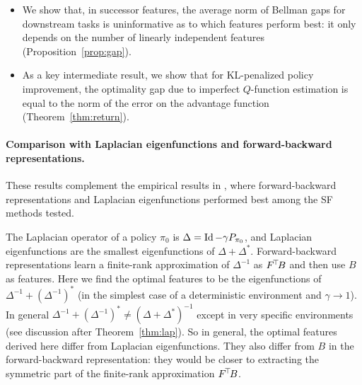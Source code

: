 \documentclass[11pt,a4paper]{article}
\newcommand{\AK}{\mathcal{A}}
\newcommand{\TODO}[1]{{\color{red} TODO: {#1}}}
\newcommand{\option}[1]{{\color[rgb]{.4,0,.8}[Optional:#1]}} %
\renewcommand{\TODO}[1]{}
\renewcommand{\option}[1]{}  %
\begin{document}
\begin{itemize}
\item We show that, in successor features, the average norm of Bellman
gaps for downstream tasks is uninformative as to
which features perform best: it only depends on the number of linearly
independent features
(Proposition~\ref{prop:gap}).

\item As a key intermediate result, we show that for KL-penalized policy
improvement, the optimality gap due to imperfect $Q$-function estimation
is equal to the norm of the error on the advantage function
(Theorem~\ref{thm:return}).

\option{
\item Finally, the advantage kernel gives the performance improvement along natural policy gradient
trajectories (Theorem \TODO{}): if $(\pi_t)_{t\geq 0}$ is the family of
policies learned by natural policy gradient on a reward $r$, then
\begin{equation}
\frac{\d}{\d t} \E_{\rho_t} [r]=\transp{r}\AK_{\pi_t} r
\end{equation}
where $\rho_t$ is the invariant distribution of $\pi_t$.}

\end{itemize}

\paragraph{Comparison with Laplacian eigenfunctions and forward-backward
representations.}
These results complement the empirical results in
\cite{zeroshot}, where forward-backward representations and Laplacian
eigenfunctions performed best among the SF methods tested.

The Laplacian operator of a policy $\pi_0$
is $\Delta=\operatorname{Id} -\gamma P_{\pi_0}$, and Laplacian eigenfunctions are
the smallest eigenfunctions of
$\Delta+\Delta^\ast$. 
Forward-backward representations learn a
finite-rank approximation of $\Delta^{-1}$ as
$F^{\!\top}\!B$ and then use $B$ as features. Here we find the optimal
features to be the eigenfunctions of $\Delta^{-1}+(\Delta^{-1})^{\ast}$
(in the simplest case of a deterministic environment and $\gamma\to 1$).
In general $\Delta^{-1}+(\Delta^{-1})^{\ast}\neq (\Delta+\Delta^\ast)^{-1}$ except
in very specific environments (see discussion after
Theorem~\ref{thm:lap}). So in general, the optimal features derived here
differ from Laplacian eigenfunctions. They also differ from $B$ in
the forward-backward representation: they would be closer to extracting the
symmetric part of the finite-rank approximation $F^{\!\top}\!B$.
\end{document}
